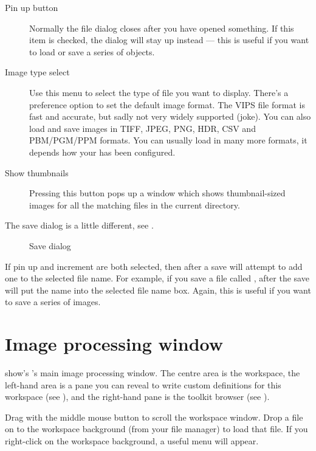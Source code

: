 \begin{description}

\item[Pin up button]
Normally the file dialog closes after you have opened something.
If this item is checked, the dialog will stay up instead --- this is useful
if you want to load or save a series of objects.

\item[Image type select]
Use this menu to select the type of file you want \nip{} to display.
There's a preference option to set the default image format.  The VIPS
file format is fast and accurate, but sadly not very widely supported
(joke). You can also load and save images in TIFF, JPEG, PNG, HDR, CSV and
PBM/PGM/PPM formats. You can usually load in many more formats, it depends
how your \nip{} has been configured.

\item[Show thumbnails]
Pressing this button pops up a window which shows thumbnail-sized images
for all the matching files in the current directory.

\end{description}

The save dialog is a little different, see 
. 

\begin{figure}
\caption{Save dialog}
\end{figure}

If pin up and increment are both selected, then after a save \nip{} will
attempt to add one to the selected file name. For example, if you save a file
called , after the save \nip{} will put the name 
into the selected file name box. Again, this is useful if you want to save
a series of images.

\section{Image processing window}

 show's \nip{}'s main image processing window. The centre
area is the workspace, the left-hand area is a pane you can reveal to write
custom definitions for this workspace (see ), and the right-hand pane is the toolkit browser (see
).

Drag with the middle mouse button to scroll the workspace window. Drop a file
on to the workspace background (from your file manager) to load that file.
If you right-click on the workspace background, a useful menu will appear.

